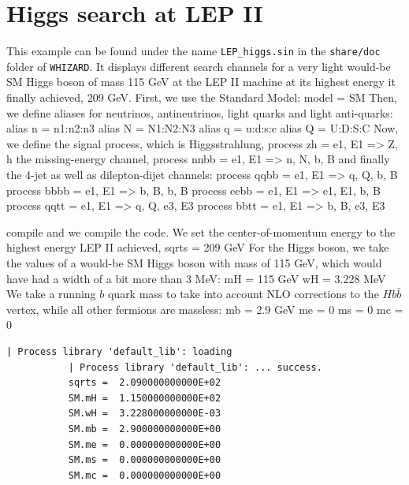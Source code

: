 \documentclass[12pt]{book}
\newenvironment{code}%
  {\begingroup\footnotesize
   \quote
   \Verbatim}%
  {\endVerbatim
   \endquote
   \endgroup\noindent}
\newcommand{\ttt}[1]{\texttt{#1}}
\newcommand{\whizard}{\ttt{WHIZARD}}
\begin{document}

\section{Higgs search at LEP II}

This example can be found under the name \ttt{LEP\_higgs.sin} in the
\ttt{share/doc} folder of \whizard. It displays different search
channels for a very light would-be SM Higgs boson of mass 115 GeV at
the LEP II machine at its highest energy it finally achieved, 209 GeV.
First, we use the Standard Model:
\begin{code}
model = SM
\end{code}
Then, we define aliases for neutrinos, antineutrinos, light quarks and
light anti-quarks:
\begin{code}
alias n = n1:n2:n3
alias N = N1:N2:N3
alias q = u:d:s:c
alias Q = U:D:S:C
\end{code}
Now, we define the signal process, which is Higgsstrahlung,
\begin{code}
process zh = e1, E1 => Z, h
\end{code}
the missing-energy channel,
\begin{code}
process nnbb = e1, E1 => n, N, b, B
\end{code}
and finally the 4-jet as well as dilepton-dijet channels:
\begin{code}
process qqbb = e1, E1 => q, Q, b, B
process bbbb = e1, E1 => b, B, b, B
process eebb = e1, E1 => e1, E1, b, B
process qqtt = e1, E1 => q, Q, e3, E3
process bbtt = e1, E1 => b, B, e3, E3

compile
\end{code}
and we compile the code. We set the center-of-momentum energy to the
highest energy LEP II achieved,
\begin{code}
sqrts = 209 GeV
\end{code}
For the Higgs boson, we take the values of a would-be SM Higgs boson
with mass of 115 GeV, which would have had a width of a bit more than
3 MeV:
\begin{code}
mH = 115 GeV
wH = 3.228 MeV
\end{code}
We take a running $b$ quark mass to take into account NLO corrections
to the $Hb\bar b$ vertex, while all other fermions are massless:
\begin{code}
mb = 2.9 GeV
me = 0
ms = 0
mc = 0
\end{code}
\begin{scriptsize}
\begin{Verbatim}[frame=single]
           | Process library 'default_lib': loading
           | Process library 'default_lib': ... success.
           sqrts =  2.090000000000E+02
           SM.mH =  1.150000000000E+02
           SM.wH =  3.228000000000E-03
           SM.mb =  2.900000000000E+00
           SM.me =  0.000000000000E+00
           SM.ms =  0.000000000000E+00
           SM.mc =  0.000000000000E+00
\end{Verbatim}
\end{scriptsize}
\end{document}
